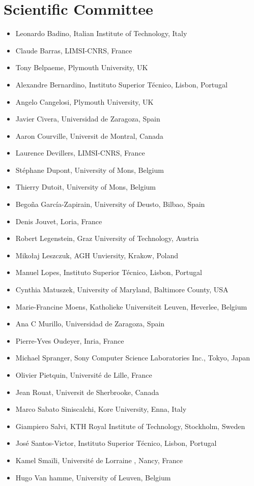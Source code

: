\documentclass{confproc}
\begin{document}
\section*{Scientific Committee}
\begin{itemize}
\item Leonardo Badino, Italian Institute of Technology, Italy
\item Claude Barras, LIMSI-CNRS, France
\item Tony Belpaeme, Plymouth University, UK
\item Alexandre Bernardino, Instituto Superior Técnico, Lisbon, Portugal
\item Angelo Cangelosi, Plymouth University, UK
\item Javier Civera, Universidad de Zaragoza, Spain
\item Aaron Courville, Universit de Montral, Canada
\item Laurence Devillers, LIMSI-CNRS, France
\item Stéphane Dupont, University of Mons, Belgium
\item Thierry Dutoit, University of Mons, Belgium
\item Begoña García-Zapirain, University of Deusto, Bilbao, Spain
\item Denis Jouvet, Loria, France
\item Robert Legenstein, Graz University of Technology, Austria
\item Mikołaj Leszczuk, AGH Unviersity, Krakow, Poland
\item Manuel Lopes, Instituto Superior Técnico, Lisbon, Portugal
\item Cynthia Matuszek, University of Maryland, Baltimore County, USA
\item Marie-Francine Moens, Katholieke Universiteit Leuven, Heverlee, Belgium
\item Ana C Murillo, Universidad de Zaragoza, Spain
\item Pierre-Yves Oudeyer, Inria, France
\item Michael Spranger, Sony Computer Science Laboratories Inc., Tokyo, Japan
\item Olivier Pietquin, Université de Lille, France
\item Jean Rouat, Universit de Sherbrooke, Canada
\item Marco Sabato Siniscalchi, Kore University, Enna, Italy
\item Giampiero Salvi, KTH Royal Institute of Technology, Stockholm, Sweden
\item José Santos-Victor, Instituto Superior Técnico, Lisbon, Portugal
\item Kamel Smaïli, Université de Lorraine , Nancy, France
\item Hugo Van hamme, University of Leuven, Belgium
\end{itemize}
\newpage
\tableofcontents
\end{document}
